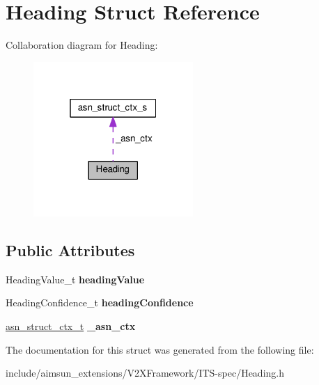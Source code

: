 \hypertarget{structHeading}{}\section{Heading Struct Reference}
\label{structHeading}


Collaboration diagram for Heading\+:\nopagebreak
\begin{figure}[H]
\begin{center}
\leavevmode
\includegraphics[width=172pt]{structHeading__coll__graph}
\end{center}
\end{figure}
\subsection*{Public Attributes}
\begin{DoxyCompactItemize}
\item 
Heading\+Value\+\_\+t {\bfseries heading\+Value}\hypertarget{structHeading_ab1cdb61ffe534d192637305cb55049b8}{}\label{structHeading_ab1cdb61ffe534d192637305cb55049b8}

\item 
Heading\+Confidence\+\_\+t {\bfseries heading\+Confidence}\hypertarget{structHeading_ad345c7c101f2b6b840377a657c424640}{}\label{structHeading_ad345c7c101f2b6b840377a657c424640}

\item 
\hyperlink{structasn__struct__ctx__s}{asn\+\_\+struct\+\_\+ctx\+\_\+t} {\bfseries \+\_\+asn\+\_\+ctx}\hypertarget{structHeading_ab0e84219241b230ff762334e0fa4a212}{}\label{structHeading_ab0e84219241b230ff762334e0fa4a212}

\end{DoxyCompactItemize}


The documentation for this struct was generated from the following file\+:\begin{DoxyCompactItemize}
\item 
include/aimsun\+\_\+extensions/\+V2\+X\+Framework/\+I\+T\+S-\/spec/Heading.\+h\end{DoxyCompactItemize}
